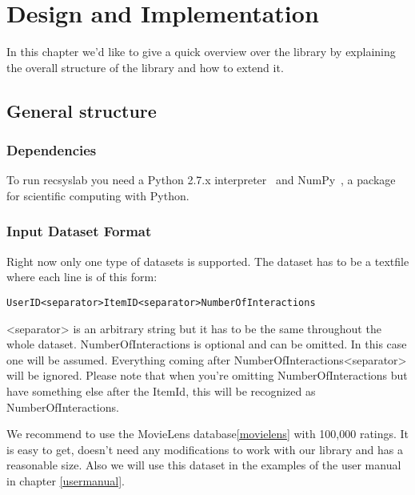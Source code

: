 
\chapter{Design and Implementation}
\label{design}
In this chapter we'd like to give a quick overview over the library
by explaining the overall structure of the library and how to extend it.


\section{General structure}
\subsection*{Dependencies}
To run recsyslab you need a Python 2.7.x interpreter~\cite{python} and NumPy~\cite{numpy},
a package for scientific computing with Python.

\subsection*{Input Dataset Format}
Right now only one type of datasets is supported. The dataset has to be
a textfile where each line is of this form:
\begin{lstlisting}
UserID<separator>ItemID<separator>NumberOfInteractions
\end{lstlisting}
<separator> is an arbitrary string but it has to be the same throughout the whole dataset.
NumberOfInteractions is optional and can be omitted. In this case one will be assumed.
Everything coming after NumberOfInteractions<separator> will be ignored.
Please note that when you're omitting NumberOfInteractions but have something else after
the ItemId, this will be recognized as NumberOfInteractions.

We recommend to use the MovieLens database\ref{movielens} with 100,000 ratings.
It is easy to get, doesn't need any modifications to work with our library and has a
reasonable size. Also we will use this dataset in the examples of the user manual in 
chapter \ref{usermanual}.

